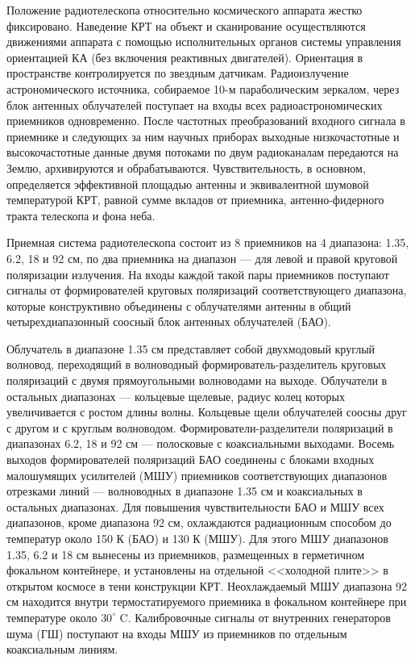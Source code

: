 Положение радиотелескопа относительно космического аппарата
жестко фиксировано. Наведение КРТ на объект и сканирование
осуществляются движениями аппарата с помощью
исполнительных органов системы управления ориентацией КА
(без включения реактивных двигателей).
Ориентация в пространстве контролируется по звездным датчикам.
Радиоизлучение астрономического источника, собираемое 10-м
параболическим зеркалом,
через блок антенных облучателей поступает на входы всех радиоастрономических
приемников одновременно. После частотных преобразований входного сигнала
в приемнике и следующих за ним научных приборах
выходные низкочастотные и
высокочастотные данные двумя потоками по двум радиоканалам
передаются на Землю, архивируются и обрабатываются.
Чувствительность, в основном, определяется эффективной площадью
антенны и эквивалентной шумовой температурой КРТ, равной сумме
вкладов от приемника, антенно-фидерного тракта телескопа и фона неба.

Приемная система радиотелескопа состоит из 8 приемников
на 4 диапазона: 1.35, 6.2, 18 и 92 см, по два приемника на
диапазон --- для левой и правой круговой поляризации излучения.
На входы каждой такой пары приемников поступают сигналы от формирователей круговых
поляризаций соответствующего диапазона, которые конструктивно объединены с
облучателями антенны в общий четырехдиапазонный соосный блок антенных облучателей
(БАО).

Облучатель в диапазоне 1.35 см представляет собой двухмодовый круглый волновод,
переходящий в волноводный формирователь-разделитель круговых поляризаций
с двумя прямоугольными волноводами на выходе.
Облучатели в остальных диапазонах --- кольцевые щелевые, радиус колец которых
увеличивается с ростом длины волны. Кольцевые щели облучателей соосны друг с другом и с
круглым волноводом. Формирователи-разделители поляризаций в диапазонах
6.2, 18 и 92 см --- полосковые с коаксиальными выходами.
Восемь выходов формирователей поляризаций БАО соединены с блоками
входных малошумящих усилителей (МШУ) приемников соответствующих диапазонов
отрезками линий --- волноводных в диапазоне 1.35 см и коаксиальных в остальных
диапазонах. Для повышения чувствительности БАО и МШУ всех диапазонов,
кроме диапазона 92 см, охлаждаются радиационным способом до температур
около 150 К (БАО) и 130 К (МШУ). Для этого МШУ диапазонов 1.35, 6.2
и 18 см вынесены из приемников, размещенных в герметичном фокальном
контейнере, и установлены на отдельной <<холодной плите>> в открытом космосе
в тени конструкции КРТ. Неохлаждаемый МШУ диапазона 92 см
находится внутри термостатируемого приемника в фокальном контейнере при
температуре около $30^\circ$ C. Калибровочные сигналы от внутренних
генераторов шума (ГШ) поступают на входы МШУ из приемников по отдельным
коаксиальным линиям.

